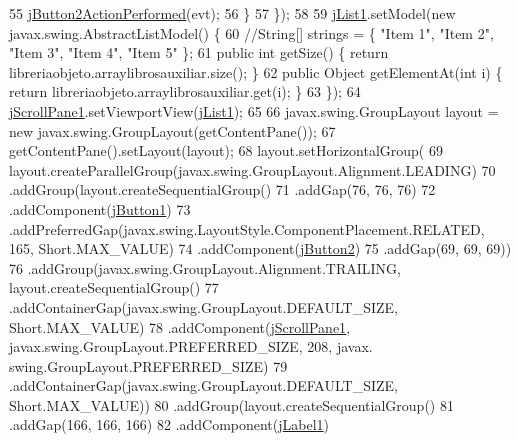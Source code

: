 \begin{DoxyCode}
55                 \mbox{\hyperlink{class_interfaz_package_1_1_consulta_lista_af864b1171ca3a578174fd3dd0904f212}{jButton2ActionPerformed}}(evt);
56             \}
57         \});
58 
59         \mbox{\hyperlink{class_interfaz_package_1_1_consulta_lista_af64dea173f739368a8fe9049edfdd9f0}{jList1}}.setModel(\textcolor{keyword}{new} javax.swing.AbstractListModel() \{
60             \textcolor{comment}{//String[] strings = \{ "Item 1", "Item 2", "Item 3", "Item 4", "Item 5" \};}
61             \textcolor{keyword}{public} \textcolor{keywordtype}{int} getSize() \{ \textcolor{keywordflow}{return} libreriaobjeto.arraylibrosauxiliar.size(); \}
62             \textcolor{keyword}{public} Object getElementAt(\textcolor{keywordtype}{int} i) \{ \textcolor{keywordflow}{return} libreriaobjeto.arraylibrosauxiliar.get(i); \}
63         \});
64         \mbox{\hyperlink{class_interfaz_package_1_1_consulta_lista_a8b791a3cb8f0a4494b0e06d5b08fe9ad}{jScrollPane1}}.setViewportView(\mbox{\hyperlink{class_interfaz_package_1_1_consulta_lista_af64dea173f739368a8fe9049edfdd9f0}{jList1}});
65 
66         javax.swing.GroupLayout layout = \textcolor{keyword}{new} javax.swing.GroupLayout(getContentPane());
67         getContentPane().setLayout(layout);
68         layout.setHorizontalGroup(
69             layout.createParallelGroup(javax.swing.GroupLayout.Alignment.LEADING)
70             .addGroup(layout.createSequentialGroup()
71                 .addGap(76, 76, 76)
72                 .addComponent(\mbox{\hyperlink{class_interfaz_package_1_1_consulta_lista_a3634a8b3f65730375cb85b196872cb4f}{jButton1}})
73                 .addPreferredGap(javax.swing.LayoutStyle.ComponentPlacement.RELATED, 165, Short.MAX\_VALUE)
74                 .addComponent(\mbox{\hyperlink{class_interfaz_package_1_1_consulta_lista_a4ce758269cf41492829b3602f2d0f5ab}{jButton2}})
75                 .addGap(69, 69, 69))
76             .addGroup(javax.swing.GroupLayout.Alignment.TRAILING, layout.createSequentialGroup()
77                 .addContainerGap(javax.swing.GroupLayout.DEFAULT\_SIZE, Short.MAX\_VALUE)
78                 .addComponent(\mbox{\hyperlink{class_interfaz_package_1_1_consulta_lista_a8b791a3cb8f0a4494b0e06d5b08fe9ad}{jScrollPane1}}, javax.swing.GroupLayout.PREFERRED\_SIZE, 208, javax.
      swing.GroupLayout.PREFERRED\_SIZE)
79                 .addContainerGap(javax.swing.GroupLayout.DEFAULT\_SIZE, Short.MAX\_VALUE))
80             .addGroup(layout.createSequentialGroup()
81                 .addGap(166, 166, 166)
82                 .addComponent(\mbox{\hyperlink{class_interfaz_package_1_1_consulta_lista_a7cebe66cb1ff10204773f2c72f76b7f3}{jLabel1}})

\end{DoxyCode}
